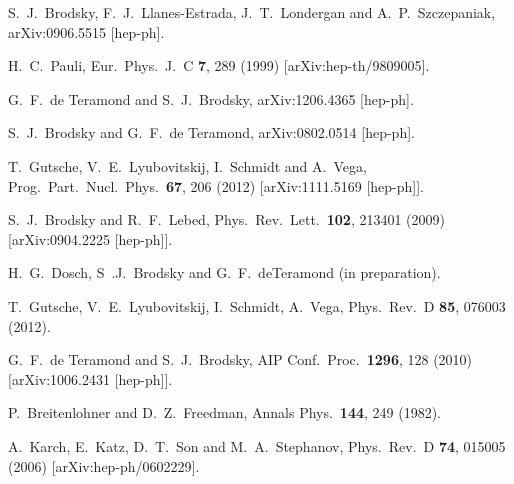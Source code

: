 \documentclass[prd,aps,onecolumn,nofootinbib]{revtex4}
\begin{document}
\begin{thebibliography}{99}
  S.~J.~Brodsky, F.~J.~Llanes-Estrada, J.~T.~Londergan and A.~P.~Szczepaniak,
  arXiv:0906.5515 [hep-ph].
 
  H.~C.~Pauli,
  Eur.\ Phys.\ J.\  C {\bf 7}, 289 (1999)
  [arXiv:hep-th/9809005].

  G.~F.~de Teramond and S.~J.~Brodsky,
  arXiv:1206.4365 [hep-ph].
  
  S.~J.~Brodsky and G.~F.~de Teramond,
  arXiv:0802.0514 [hep-ph].
  
  T.~Gutsche, V.~E.~Lyubovitskij, I.~Schmidt and A.~Vega,
  Prog.\ Part.\ Nucl.\ Phys.\  {\bf 67}, 206 (2012)
  [arXiv:1111.5169 [hep-ph]].

  S.~J.~Brodsky and R.~F.~Lebed,
  Phys.\ Rev.\ Lett.\  {\bf 102}, 213401 (2009)
  [arXiv:0904.2225 [hep-ph]].
  
  H.~G.~Dosch, S~.J.~Brodsky and G.~F.~deTeramond (in preparation).
  
  T.~Gutsche, V.~E.~Lyubovitskij, I.~Schmidt, A.~Vega,
Phys.\ Rev.\ D {\bf 85}, 076003 (2012).

  G.~F.~de Teramond and S.~J.~Brodsky,
  AIP Conf.\ Proc.\  {\bf 1296}, 128 (2010)
  [arXiv:1006.2431 [hep-ph]].

  P.~Breitenlohner and D.~Z.~Freedman,
  Annals Phys.\  {\bf 144}, 249 (1982).

  A.~Karch, E.~Katz, D.~T.~Son and M.~A.~Stephanov,
  Phys.\ Rev.\  D {\bf 74}, 015005 (2006)
  [arXiv:hep-ph/0602229].
  

\end{thebibliography}
\end{document}
